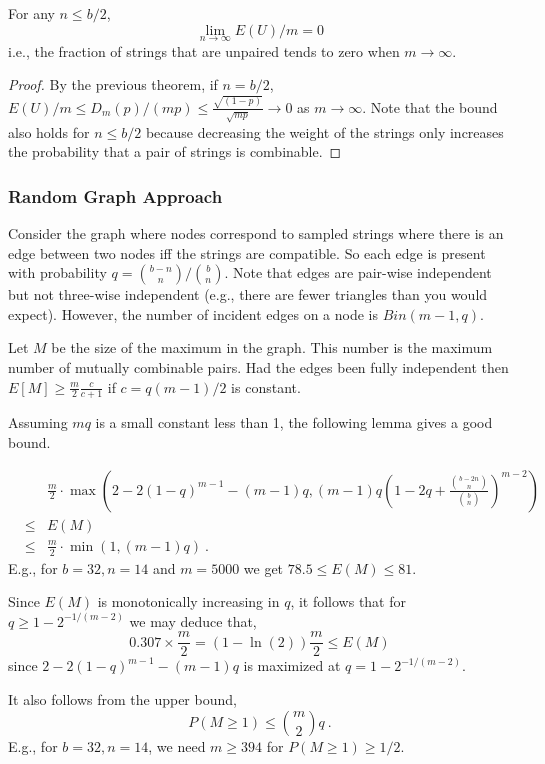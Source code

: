 \begin{corollary}
For any $n\leq b/2$, \[\lim_{n\rightarrow \infty} E(U)/m=0\] i.e.,  the fraction of strings that are unpaired tends to zero when $m\rightarrow \infty$.
\end{corollary}
\begin{proof}
By the previous theorem, if $n=b/2$, $E(U)/m \leq D_m(p)/(mp)\leq \frac{\sqrt{(1-p)}}{\sqrt{mp}} \rightarrow 0$ as $m\rightarrow \infty$. Note that the bound also holds for $n\leq b/2$ because decreasing the weight of the strings only increases the probability that a pair of strings is combinable.
\end{proof}

\subsubsection{Random Graph Approach}
Consider the graph where nodes correspond to sampled strings where there
is an edge between two nodes iff the strings are compatible. So each
edge is present with probability $q={b-n \choose n}/{b\choose
  n}$. Note that edges are pair-wise independent but not three-wise
independent (e.g., there are fewer triangles than you would
expect). However, the number of incident edges on a node is
$Bin(m-1,q)$.

Let $M$ be the size of the maximum in the graph. This number is the maximum
number of mutually combinable pairs. Had the edges been fully
independent then $E[M]\geq \frac{m}{2}\frac{c}{c+1}$ if $c=q(m-1)/2$
is constant.

Assuming $mq$ is a small constant less than 1, the following lemma gives a good bound.
\begin{lemma}
\begin{eqnarray*}
& & \frac{m}{2} \cdot  \max \left (2-2(1-q)^{m-1}-(m-1) q,(m-1) q\left (1-2q+\frac{{b-2n \choose n}}{{b \choose n}}\right )^{m-2}\right ) \\
&\leq & E(M) \\
& \leq & \frac{m}{2} \cdot  \min(1,(m-1)q) \ .
\end{eqnarray*} 
E.g., for $b=32, n=14$ and $m=5000$ we get $78.5 \leq E(M)\leq 81$. 

Since $E(M)$ is monotonically increasing in $q$, it follows that for $q\geq 1-2^{-1/(m-2)}$ we may deduce that, 
\[0.307 \times \frac{m}{2}=(1-\ln(2))\frac{m}{2} \leq E(M)\]
since $2-2(1-q)^{m-1}-(m-1) q$ is maximized at $q=1-2^{-1/(m-2)}$.
%

It also follows from the upper bound,
\[P(M\geq 1)\leq {m \choose 2} q \ .\]
E.g., for $b=32, n=14$, we need $m\geq 394$ for $P(M\geq 1)\geq 1/2$.
\end{lemma}

